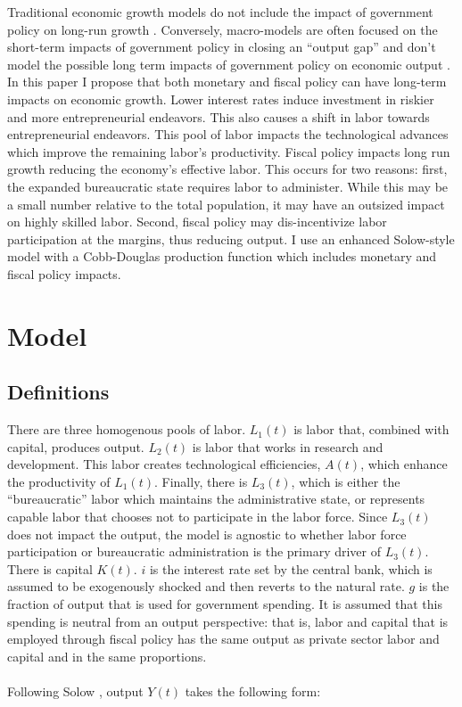\documentclass[12pt]{article}
\theoremstyle{definition}
\begin{document}
Traditional economic growth models do not include the impact of government policy on long-run growth \cite{solow}. Conversely, macro-models are often focused on the short-term impacts of government policy in closing an ``output gap'' and don't model the possible long term impacts of government policy on economic output \cite{mankiwreis}.  In this paper I propose that both monetary and fiscal policy can have long-term impacts on economic growth.  Lower interest rates induce investment in riskier and more entrepreneurial endeavors.  This also causes a shift in labor towards entrepreneurial endeavors.  This pool of labor impacts the technological advances which improve the remaining labor's productivity.  Fiscal policy impacts long run growth reducing the economy's effective labor.  This occurs for two reasons: first, the expanded bureaucratic state requires labor to administer.  While this may be a small number relative to the total population, it may have an outsized impact on highly skilled labor.  Second, fiscal policy may dis-incentivize labor participation at the margins, thus reducing output.  I use an enhanced Solow-style model with a Cobb-Douglas production function which includes monetary and fiscal policy impacts.

\section{Model}

\subsection{Definitions}
There are three homogenous pools of labor.  \(L_1(t)\) is labor that, combined with capital, produces output.  \(L_2(t)\) is labor that works in research and development.  This labor creates technological efficiencies, \(A(t)\), which enhance the productivity of \(L_1(t)\).  Finally, there is \(L_3(t)\), which is either the ``bureaucratic'' labor which maintains the administrative state, or represents capable labor that chooses not to participate in the labor force.  Since \(L_3(t)\) does not impact the output, the model is agnostic to whether labor force participation or bureaucratic administration is the primary driver of \(L_3(t)\).  There is capital \(K(t)\).  \(i\) is the interest rate set by the central bank, which is assumed to be exogenously shocked and then reverts to the natural rate.  \(g\) is the fraction of output that is used for government spending.  It is assumed that this spending is neutral from an output perspective: that is, labor and capital that is employed through fiscal policy has the same output as private sector labor and capital and in the same proportions.
\\
\\
Following Solow \cite{solow}, output \(Y(t)\) takes the following form:
\end{document}
